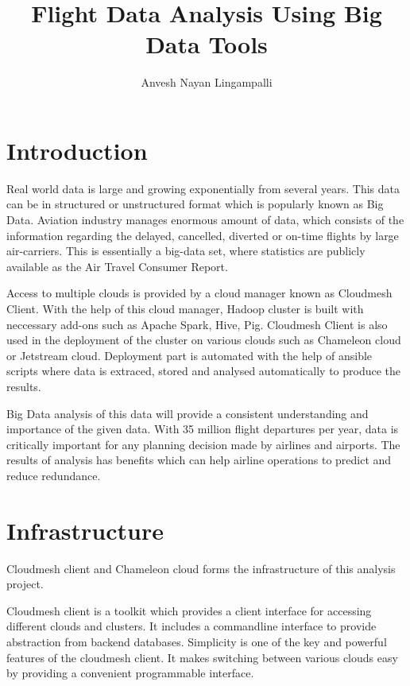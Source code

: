 \documentclass[9pt,twocolumn,twoside]{../../styles/osajnl}
\title{Flight Data Analysis Using Big Data Tools}
\author[1,*]{Anvesh Nayan Lingampalli}
\affil[1]{School of Informatics and Computing, Bloomington, IN 47408, U.S.A.}
\affil[*]{Corresponding authors:anveling@indiana.edu}
\begin{document}
\maketitle

\section{Introduction}

Real world data is large and growing exponentially from several
years. This data can be in structured or unstructured format which is
popularly known as Big Data\cite{bigdata}. Aviation industry manages
enormous amount of data, which consists of the information regarding
the delayed, cancelled, diverted or on-time flights by large
air-carriers\cite{aviationanalysis}. This is essentially a big-data
set, where statistics are publicly available as the Air Travel
Consumer Report.

Access to multiple clouds is provided by a cloud manager known as
Cloudmesh Client\cite{cloudmesh}. With the help of this cloud manager,
Hadoop cluster is built with neccessary add-ons such as Apache
Spark\cite{spark}, Hive\cite{hive}, Pig\cite{pig}. Cloudmesh Client is
also used in the deployment of the cluster on various clouds such as
Chameleon cloud\cite{chameleon} or Jetstream\cite{jetstream}
cloud. Deployment part is automated with the help of
ansible\cite{ansible} scripts where data is extraced, stored and
analysed automatically to produce the results.

Big Data analysis of this data will provide a
consistent understanding and importance of the given data. With 35
million flight departures per year, data is critically important for
any planning decision made by airlines and airports. The results of
analysis has benefits which can help airline operations to predict and
reduce redundance\cite{bigdatainaviation}.

\section{Infrastructure}

Cloudmesh client and Chameleon cloud forms the infrastructure of this
analysis project.

Cloudmesh client is a toolkit which provides a client interface for
accessing different clouds and clusters. It includes a commandline
interface to provide abstraction from backend databases. Simplicity is
one of the key and powerful features of the cloudmesh client. It makes
switching between various clouds easy by providing a convenient
programmable interface.
\end{document}
